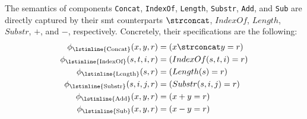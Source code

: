 \raggedbottom
%
The semantics of components \lstinline{Concat}, \lstinline{IndexOf},
\lstinline{Length}, \lstinline{Substr}, \lstinline{Add}, and \lstinline{Sub}
are directly captured by their \gls{smt} counterparts $\strconcat$, $IndexOf$,
$Length$, $Substr$, $+$, and $-$, respectively.
Concretely, their specifications are the following:
%
\begin{align*}
  \phi{}_{\text{\lstinline{Concat}}}(x, y, r)     &= (x \strconcat y   = r) \\
  \phi{}_{\text{\lstinline{IndexOf}}}(s, t, i, r) &= (IndexOf(s, t, i) = r) \\
  \phi{}_{\text{\lstinline{Length}}}(s, r)        &= (Length(s)        = r) \\
  \phi{}_{\text{\lstinline{Substr}}}(s, i, j, r)  &= (Substr(s, i, j)  = r) \\
  \phi{}_{\text{\lstinline{Add}}}(x, y, r)        &= (x + y            = r) \\
  \phi{}_{\text{\lstinline{Sub}}}(x, y, r)        &= (x - y            = r)
\end{align*}
%
